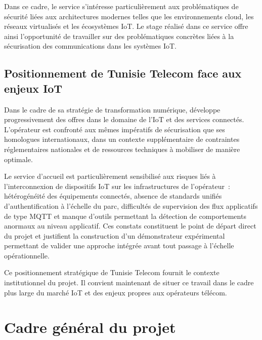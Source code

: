 Dans ce cadre, le service s'intéresse particulièrement aux problématiques de sécurité liées aux architectures modernes telles que les environnements cloud, les réseaux virtualisés et les écosystèmes IoT. Le stage réalisé dans ce service offre ainsi l'opportunité de travailler sur des problématiques concrètes liées à la sécurisation des communications dans les systèmes IoT.

\subsection{Positionnement de Tunisie Telecom face aux enjeux IoT}
\label{subsec:tt-iot}

Dans le cadre de sa stratégie de transformation numérique, \TT{} développe progressivement des offres dans le domaine de l'IoT et des services connectés. L'opérateur est confronté aux mêmes impératifs de sécurisation que ses homologues internationaux, dans un contexte supplémentaire de contraintes réglementaires nationales et de ressources techniques à mobiliser de manière optimale.

Le service d'accueil est particulièrement sensibilisé aux risques liés à l'interconnexion de dispositifs IoT sur les infrastructures de l'opérateur~: hétérogénéité des équipements connectés, absence de standards unifiés d'authentification à l'échelle du parc, difficultés de supervision des flux applicatifs de type MQTT et manque d'outils permettant la détection de comportements anormaux au niveau applicatif. Ces constats constituent le point de départ direct du projet et justifient la construction d'un démonstrateur expérimental permettant de valider une approche intégrée avant tout passage à l'échelle opérationnelle.

Ce positionnement stratégique de Tunisie Telecom fournit le contexte institutionnel du projet. Il convient maintenant de situer ce travail dans le cadre plus large du marché IoT et des enjeux propres aux opérateurs télécom.

\section{Cadre général du projet}
\label{sec:contexte-general}

